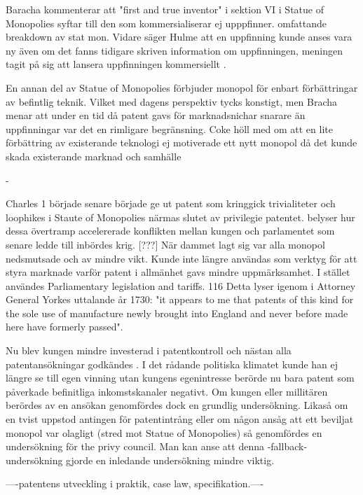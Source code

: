 Baracha kommenterar att "first and true inventor" i sektion VI i Statue of Monopolies syftar till den som kommersialiserar ej upppfinner.
omfattande breakdown av stat mon. Vidare säger Hulme att en uppfinning kunde anses vara ny även om det fanns tidigare skriven information om uppfinningen, meningen tagit på sig att lansera uppfinningen kommersiellt \cite{hulme}.

En annan del av Statue of Monopolies förbjuder monopol för enbart förbättringar av befintlig teknik. Vilket med dagens perspektiv tycks konstigt, men Bracha menar att under en tid då patent gavs för marknadsnichar snarare än uppfinningar var det en rimligare begränsning.
Coke höll med om att en lite förbättring av existerande teknologi ej motiverade ett nytt monopol då det kunde skada existerande marknad och samhälle\cite{bracha}

-

Charles 1 började senare började ge ut patent som kringgick trivialiteter och loophikes i Staute of
Monopolies närmas slutet av privilegie patentet. \cite{Fox} belyser hur dessa övertramp accelererade
konflikten mellan kungen och parlamentet som senare ledde till inbördes krig. [???] När dammet lagt sig
var alla monopol nedsmutsade och av mindre vikt. Kunde inte längre användas som verktyg för att styra
marknade varför patent i allmänhet gavs mindre uppmärksamhet. I stället användes Parliamentary
legislation and tariffs. 116 Detta lyser igenom i Attorney General Yorkes uttalande år 1730: "it appears to me that patents of this kind for the sole use of manufacture newly brought into England and never before made here have formerly passed"\cite{macleod2}. 

Nu blev kungen mindre investerad i patentkontroll och nästan alla
patentansökningar godkändes \cite{bracha}. I det rådande politiska klimatet kunde han ej längre se till
egen vinning utan kungens egenintresse berörde nu bara patent som påverkade befinitliga inkomstskanaler
negativt. \cite{macleod2} Om kungen eller millitären berördes av en ansökan genomfördes dock en grundlig
undersökning. Likaså om en tvist uppstod antingen för patentintrång eller om någon ansåg att ett beviljat
monopol var olagligt (stred mot Statue of Monopolies) så genomfördes en undersökning för the privy
council. Man kan anse att denna -fallback- undersökning gjorde en inledande undersökning mindre viktig.

----patentens utveckling i praktik, case law, specifikation.----

